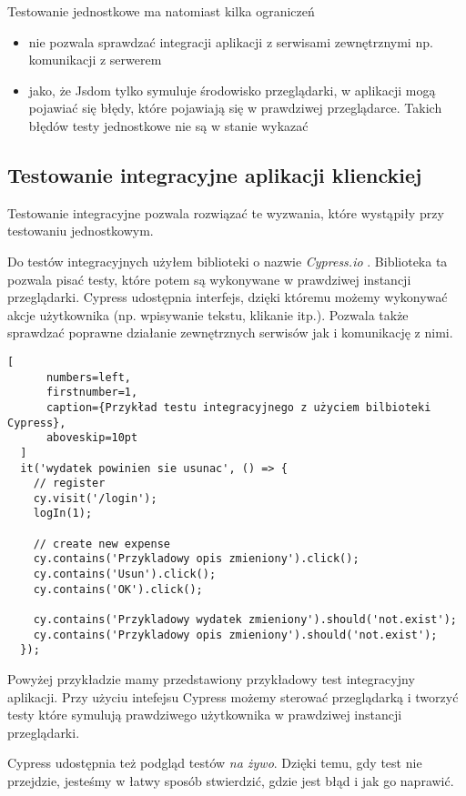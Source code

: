 Testowanie jednostkowe ma natomiast kilka ograniczeń
\begin{itemize}
  \item nie pozwala sprawdzać integracji aplikacji z serwisami zewnętrznymi np. komunikacji z serwerem
  \item jako, że Jsdom tylko symuluje środowisko przeglądarki, w aplikacji mogą pojawiać się błędy, które pojawiają się w prawdziwej przeglądarce. Takich błędów testy jednostkowe nie są w stanie wykazać
\end{itemize}

\subsection{Testowanie integracyjne aplikacji klienckiej}
Testowanie integracyjne pozwala rozwiązać te wyzwania, które wystąpiły przy testowaniu jednostkowym.

Do testów integracyjnych użyłem biblioteki o nazwie \emph{Cypress.io} \cite{ref_cypress_doc}. Biblioteka ta pozwala pisać testy, które potem są wykonywane w prawdziwej instancji przeglądarki. Cypress udostępnia interfejs, dzięki któremu możemy wykonywać akcje użytkownika (np. wpisywanie tekstu, klikanie itp.). Pozwala także sprawdzać poprawne działanie zewnętrznych serwisów jak i komunikację z nimi.

  \begin{addmargin}[6mm]{0mm}
  \begin{lstlisting}[
      numbers=left,
      firstnumber=1,
      caption={Przykład testu integracyjnego z użyciem bilbioteki Cypress},
      aboveskip=10pt
  ]
  it('wydatek powinien sie usunac', () => {
    // register
    cy.visit('/login');
    logIn(1);

    // create new expense
    cy.contains('Przykladowy opis zmieniony').click();
    cy.contains('Usun').click();
    cy.contains('OK').click();

    cy.contains('Przykladowy wydatek zmieniony').should('not.exist');
    cy.contains('Przykladowy opis zmieniony').should('not.exist');
  });
  \end{lstlisting}
  \end{addmargin}
  Powyżej przykładzie mamy przedstawiony przykładowy test integracyjny aplikacji. Przy użyciu intefejsu Cypress możemy sterować przeglądarką i tworzyć testy które symulują prawdziwego użytkownika w prawdziwej instancji przeglądarki.

Cypress udostępnia też podgląd testów \emph{na żywo}. Dzięki temu, gdy test nie przejdzie, jesteśmy w łatwy sposób stwierdzić, gdzie jest błąd i jak go naprawić.


